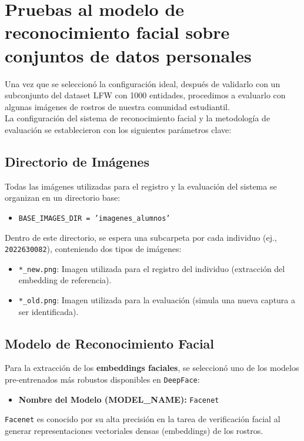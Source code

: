 \section{Pruebas al modelo de reconocimiento facial sobre conjuntos de datos personales}

Una vez que se seleccionó la configuración ideal, después de validarlo con un subconjunto del dataset LFW con 1000 entidades, procedimos a evaluarlo con algunas imágenes de rostros de nuestra comunidad estudiantil.\\


La configuración del sistema de reconocimiento facial y la metodología de evaluación se establecieron con los siguientes parámetros clave:


\subsection{Directorio de Imágenes}
Todas las imágenes utilizadas para el registro y la evaluación del sistema se organizan en un directorio base:
\begin{itemize}
	\item \texttt{BASE\_IMAGES\_DIR = 'imagenes\_alumnos'}
\end{itemize}
Dentro de este directorio, se espera una subcarpeta por cada individuo (ej., \texttt{2022630082}), conteniendo dos tipos de imágenes:
\begin{itemize}
	\item \texttt{*\_new.png}: Imagen utilizada para el registro del individuo (extracción del embedding de referencia).
	\item \texttt{*\_old.png}: Imagen utilizada para la evaluación (simula una nueva captura a ser identificada).
\end{itemize}

\subsection{Modelo de Reconocimiento Facial}
Para la extracción de los \textbf{embeddings faciales}, se seleccionó uno de los modelos pre-entrenados más robustos disponibles en \texttt{DeepFace}:
\begin{itemize}
	\item \textbf{Nombre del Modelo (MODEL\_NAME):} \texttt{Facenet}
\end{itemize}
\texttt{Facenet} es conocido por su alta precisión en la tarea de verificación facial al generar representaciones vectoriales densas (embeddings) de los rostros.

